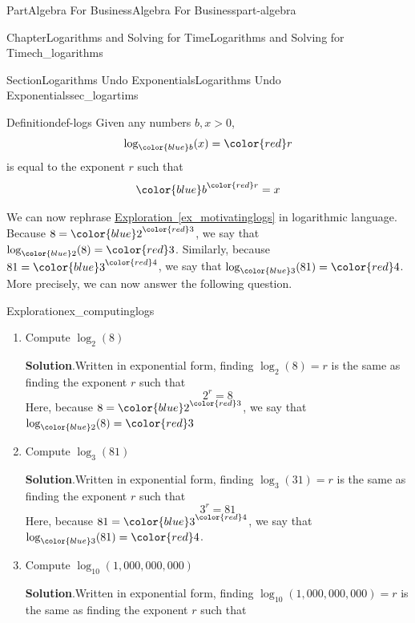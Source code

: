 \documentclass[oneside,10pt,]{tufte-book}
\newcommand{\blocktitlefont}{\relax}
\newcommand{\xreffont}{\relax}
\numberwithin{equation}{chapter}
\begin{document}
\begin{partptx}{Part}{Algebra For Business}{}{Algebra For Business}{}{}{part-algebra}
\begin{chapterptx}{Chapter}{Logarithms and Solving for Time}{}{Logarithms and Solving for Time}{}{}{ch_logarithms}
\begin{sectionptx}{Section}{Logarithms Undo Exponentials}{}{Logarithms Undo Exponentials}{}{}{sec_logartims}
\begin{definition}{Definition}{}{def-logs}%
Given any numbers \(b,x>0\),%
\begin{equation*}
\log_{\color{blue}b}(x) = {\color{red} r}
\end{equation*}
is equal to the exponent \(r\) such that%
\begin{equation*}
{\color{blue}b}^{\color{red} r} = x
\end{equation*}
%
\end{definition}
We can now rephrase \hyperref[ex_motivatinglogs]{Exploration~{\xreffont\ref{ex_motivatinglogs}}} in logarithmic language. Because \(8 = {\color{blue}2}^{\color{red}3}\), we say that \(\log_{\color{blue} 2}(8) = {\color{red}3}\). Similarly, because \(81 = {\color{blue}3}^{\color{red}4}\), we say that \(\log_{\color{blue} 3} (81) = {\color{red}4}\). More precisely, we can now answer the following question.%
\begin{exploration}{Exploration}{}{ex_computinglogs}%
\begin{enumerate}[font=\bfseries,label=(\alph*),ref=\alph*]%
\item{}Compute \(\log_2(8)\)%
\par\smallskip%
\noindent\textbf{\blocktitlefont Solution}.\hypertarget{ex_computinglogs-1-2}{}\quad{}Written in exponential form, finding \(\log_2(8) = r\) is the same as finding the exponent \(r\) such that%
\begin{equation*}
2^r = 8
\end{equation*}
Here, because \(8 = {\color{blue}2}^{\color{red}3}\), we say that \(\log_{\color{blue} 2}(8) = {\color{red}3}\)%
\item{}Compute \(\log_3(81)\)%
\par\smallskip%
\noindent\textbf{\blocktitlefont Solution}.\hypertarget{ex_computinglogs-2-2}{}\quad{}Written in exponential form, finding \(\log_3(31) = r\) is the same as finding the exponent \(r\) such that%
\begin{equation*}
3^r = 81
\end{equation*}
Here, because \(81 = {\color{blue}3}^{\color{red}4}\), we say that \(\log_{\color{blue} 3} (81) = {\color{red}4}\).%
\item{}Compute \(\log_{10}(1,000,000,000)\)%
\par\smallskip%
\noindent\textbf{\blocktitlefont Solution}.\hypertarget{ex_computinglogs-3-2}{}\quad{}Written in exponential form, finding \(\log_10(1,000,000,000) = r\) is the same as finding the exponent \(r\) such that%
\begin{equation*}

\end{equation*}
\end{enumerate}
\end{exploration}
\end{sectionptx}
\end{chapterptx}
\end{partptx}
\end{document}
